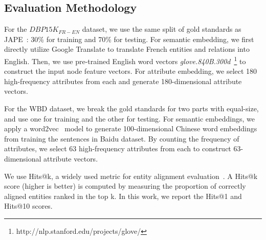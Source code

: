 	\subsection{Evaluation Methodology}
    	For the $DBP15K_{FR-EN}$ dataset, we use the same split of gold standards as JAPE~\cite{sun2017cross}: 30\% for training and 70\% for
    testing.
	For semantic embedding, we first directly utilize Google Translate to translate French entities and relations into English.
	Then, we use pre-trained English word vectors \emph{glove.840B.300d}~\footnote{http://nlp.stanford.edu/projects/glove/} to construct the input node feature vectors.
	For attribute embedding, we select 180 high-frequency attributes from each \KG and generate 180-dimensional attribute vectors.	


	For the WBD dataset, we break the gold standards for two parts with equal-size, and use one for training and the other for testing.
	For semantic embeddings, we apply a word2vec~\cite{Mikolov2013Efficient} model to generate 100-dimensional Chinese word embeddings from training the sentences in Baidu dataset.
	By counting the frequency of attributes, we select 63 high-frequency attributes from each \KG to construct 63-dimensional attribute vectors.



	
 	We use Hits@k, a widely used metric for entity
 alignment evaluation~\cite{hao2016joint,chen2016multilingual,sun2017cross,zhu2017iterative}. A Hits@k score (higher is better) is computed by
 measuring the proportion of correctly aligned entities ranked in the top k. In this work, we report the Hits@1 and Hits@10 scores.
	
